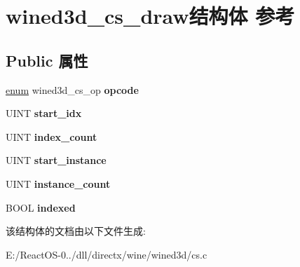 \hypertarget{structwined3d__cs__draw}{}\section{wined3d\+\_\+cs\+\_\+draw结构体 参考}
\label{structwined3d__cs__draw}
\subsection*{Public 属性}
\begin{DoxyCompactItemize}
\item 
\mbox{\label{structwined3d__cs__draw_a0d017d092acd63a2b3244971f2ca148e}} 
\hyperlink{interfaceenum}{enum} wined3d\+\_\+cs\+\_\+op {\bfseries opcode}
\item 
\mbox{\label{structwined3d__cs__draw_aa874485f621f6b8a9b00202c23e77937}} 
U\+I\+NT {\bfseries start\+\_\+idx}
\item 
\mbox{\label{structwined3d__cs__draw_ae1415ddb7635a7d721aa7ae17ba85a7e}} 
U\+I\+NT {\bfseries index\+\_\+count}
\item 
\mbox{\label{structwined3d__cs__draw_a876416c7c915a448c5efe902e3cd7bdf}} 
U\+I\+NT {\bfseries start\+\_\+instance}
\item 
\mbox{\label{structwined3d__cs__draw_a788adf295d78b450b22f40c6562b32ec}} 
U\+I\+NT {\bfseries instance\+\_\+count}
\item 
\mbox{\label{structwined3d__cs__draw_a1da0a8e51e4380ba915aa369358b78b5}} 
B\+O\+OL {\bfseries indexed}
\end{DoxyCompactItemize}


该结构体的文档由以下文件生成\+:\begin{DoxyCompactItemize}
\item 
E\+:/\+React\+O\+S-\/0../dll/directx/wine/wined3d/cs.\+c\end{DoxyCompactItemize}
